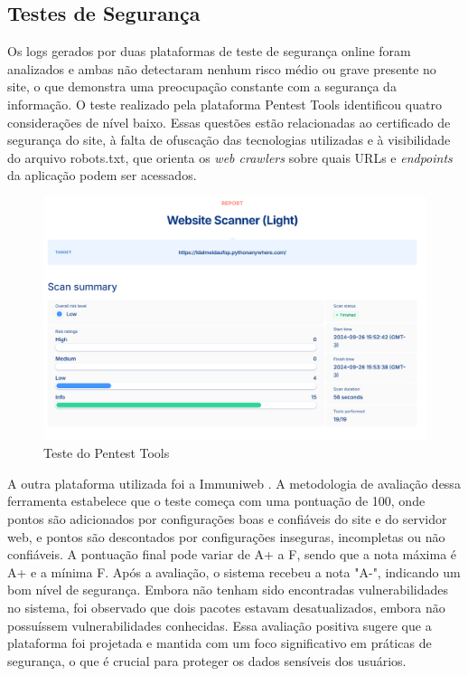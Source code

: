 \subsection{Testes de Segurança}

Os logs gerados por duas plataformas de teste de segurança online foram analizados e ambas não detectaram nenhum risco médio ou grave presente no site, o que demonstra uma preocupação constante com a segurança da informação. O teste realizado pela plataforma Pentest Tools \cite{Pentest} identificou quatro considerações de nível baixo. Essas questões estão relacionadas ao certificado de segurança do site, à falta de ofuscação das tecnologias utilizadas e à visibilidade do arquivo robots.txt, que orienta os \textit{web crawlers} sobre quais \ac{URLs} e \textit{endpoints} da aplicação podem ser acessados.

\begin{figure}[htb] \caption{\label{fig_grafico}Teste do Pentest Tools} \begin{center} \includegraphics[scale=0.3]{./img/pentest.png} \end{center}  \end{figure}

A outra plataforma utilizada foi a Immuniweb \cite{Immuniweb}. A metodologia de avaliação dessa ferramenta estabelece que o teste começa com uma pontuação de 100, onde pontos são adicionados por configurações boas e confiáveis do site e do servidor web, e pontos são descontados por configurações inseguras, incompletas ou não confiáveis. A pontuação final pode variar de A+ a F, sendo que a nota máxima é A+ e a mínima F. Após a avaliação, o sistema recebeu a nota "A-", indicando um bom nível de segurança. Embora não tenham sido encontradas vulnerabilidades no sistema, foi observado que dois pacotes estavam desatualizados, embora não possuíssem vulnerabilidades conhecidas. Essa avaliação positiva sugere que a plataforma foi projetada e mantida com um foco significativo em práticas de segurança, o que é crucial para proteger os dados sensíveis dos usuários.

